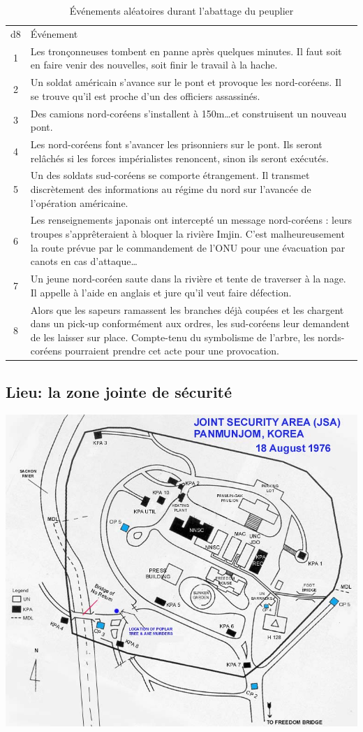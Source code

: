 \begin{table}
	\caption{Événements aléatoires durant l'abattage du peuplier}
	\label{table:peuplier}
	\begin{tabularx}{0.9\textwidth}{cX}
	d8 & Événement\\
	1  & Les tronçonneuses tombent en panne après quelques minutes. Il faut soit en faire venir des nouvelles, soit finir le travail à la hache.\\
	2  & Un soldat américain s'avance sur le pont et provoque les nord-coréens. Il se trouve qu'il est proche d'un des officiers assassinés.\\
	3  & Des camions nord-coréens s'installent à 150m\dots et construisent un nouveau pont.\\
	4  & Les nord-coréens font s'avancer les prisonniers sur le pont. Ils seront relâchés si les forces impérialistes renoncent, sinon ils seront exécutés.\\
	5  & Un des soldats sud-coréens se comporte étrangement. Il transmet discrètement des informations au régime du nord sur l'avancée de l'opération américaine.\\
	6  & Les renseignements japonais ont intercepté un message nord-coréens : leurs troupes s'apprêteraient à bloquer la rivière Imjin. C'est malheureusement la route prévue par le commandement de l'ONU pour une évacuation par canots en cas d'attaque\dots\\
	7  & Un jeune nord-coréen saute dans la rivière et tente de traverser à la nage. Il appelle à l'aide en anglais et jure qu'il veut faire défection.\\
	8  & Alors que les sapeurs ramassent les branches déjà coupées et les chargent dans un pick-up conformément aux ordres, les sud-coréens leur demandent de les laisser sur place. Compte-tenu du symbolisme de l'arbre, les nords-coréens pourraient prendre cet acte pour une provocation.\\
	\end{tabularx}
\end{table}

\subsection*{Lieu: la zone jointe de sécurité}

\includegraphics[width=\textwidth]{images/Joint_Security_Area_1976_map.jpg}

